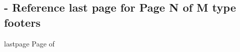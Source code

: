 
\subsection{ - Reference last page for Page N of M type footers}

\begin{demo}{}{lastpage}
  Page \thepage{} of \pageref{LastPage}
\end{demo}
